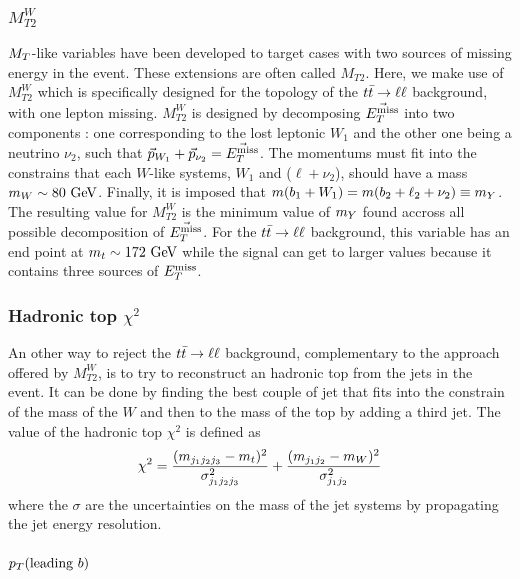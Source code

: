         \subsubsection{$M_{T2}^{W}$}

        $M_T$-like variables have been developed to target cases with two sources of missing energy
        in the event.  These extensions are often called $M_{T2}$. Here, we make use of
        $M_{T2}^W$ which is specifically designed for the topology of the $t\bar{t} \rightarrow \ell \ell$ background, with
        one lepton missing. $M_{T2}^W$ is designed by decomposing $\vec{E_T^\text{miss}}$ into two
        components : one corresponding to the lost leptonic $W_1$ and the other one being
        a neutrino $\nu_2$, such that $\vec{p}_{W_1} + \vec{p}_{\nu_2} = \vec{E_T^\text{miss}}$.
        The momentums must fit into the constrains that each $W$-like systems, $W_1$ and
        ($\ell + \nu_2$), should have a mass $m_W \sim 80 ~\text{GeV}$. Finally, it is imposed that
        $m(b_1 + W_1) = m(b_2 + \ell_2 + \nu_2) \equiv m_{Y}$.
        The resulting value for $M_{T2}^W$ is the minimum value of $m_{Y}$ found accross
        all possible decomposition of $\vec{E_T^\text{miss}}$. For the $t\bar{t} \rightarrow \ell \ell$ background,
        this variable has an end point at $m_t \sim 172~\text{GeV}$ while the signal can get to
        larger values because it contains three sources of $E_T^\text{miss}$.


        \subsubsection{Hadronic top $\chi^{2}$}

        An other way to reject the $t\bar{t} \rightarrow \ell \ell$ background, complementary to the approach
        offered by $M_{T2}^{W}$, is to try to reconstruct an hadronic top from the jets
        in the event. It can be done by finding the best couple of jet that fits into
        the constrain of the mass of the $W$ and then to the mass of the top by adding a
        third jet. The value of the hadronic top $\chi^2$ is defined as
        $$\chi^2 = \frac{(m_{j_1 j_2 j_3} - m_{t})^2}{\sigma^2_{j_1 j_2 j_3}} + \frac{(m_{j_1 j_2} - m_{W})^2}{\sigma^2_{j_1 j_2}}$$
        where the $\sigma$ are the uncertainties on the mass of the jet systems by
        propagating the jet energy resolution.

        \subsubsection{$p_T(\text{leading } b)$}

